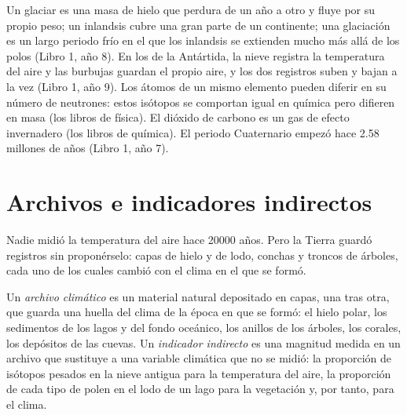 \begin{recall}
Un glaciar es una masa de hielo que perdura de un año a otro y fluye por su
propio peso; un inlandsis cubre una gran parte de un continente; una glaciación es un
largo periodo frío en el que los inlandsis se extienden mucho más allá de los polos (Libro 1, año 8).
En los  de la Antártida, la nieve registra la temperatura del aire y las
burbujas guardan el propio aire, y los dos registros suben y bajan a la vez
(Libro 1, año 9). Los átomos de un mismo elemento pueden diferir en su número de
neutrones: estos isótopos se comportan igual en química pero difieren en masa (los
libros de física). El dióxido de carbono es un gas de efecto invernadero (los libros de química).
El periodo Cuaternario empezó hace 2.58 millones de años
(Libro 1, año 7).
\end{recall}

\section{Archivos e indicadores indirectos}

Nadie midió la temperatura del aire hace \num{20000} años. Pero la
Tierra guardó registros sin proponérselo: capas de hielo y de lodo, conchas y troncos
de árboles, cada uno de los cuales cambió con el clima en el que se formó.

\begin{definition}\label{def:g12:past-climates:proxy}
Un \emph{archivo climático} es un material natural depositado
en capas, una tras otra, que guarda una huella del clima de la
época en que se formó: el hielo polar, los sedimentos de los lagos y del fondo
oceánico, los anillos de los árboles, los corales, los depósitos de las cuevas. Un \emph{indicador indirecto} es una
magnitud medida en un archivo que sustituye a una variable climática que
no se midió: la proporción de isótopos pesados en la nieve antigua para la temperatura
del aire, la proporción de cada tipo de polen en el lodo de un lago para la vegetación
y, por tanto, para el clima.
\end{definition}

